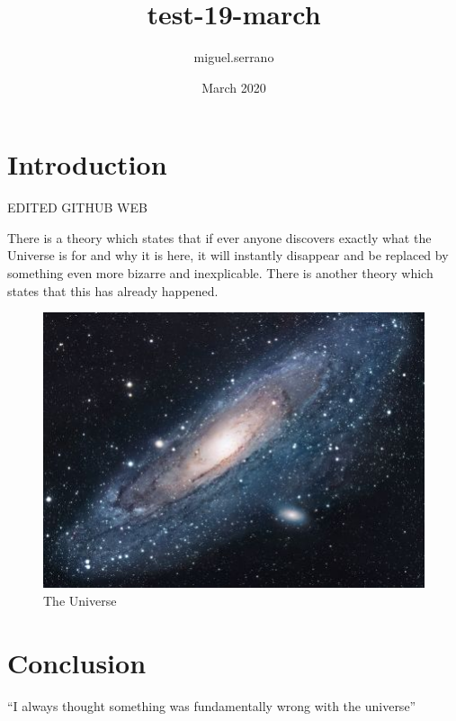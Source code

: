 \documentclass{article}
\title{test-19-march}
\author{miguel.serrano }
\date{March 2020}
\begin{document}
\maketitle

\section{Introduction}

EDITED GITHUB WEB


There is a theory which states that if ever anyone discovers exactly what the Universe is for and why it is here, it will instantly disappear and be replaced by something even more bizarre and inexplicable.
There is another theory which states that this has already happened.

\begin{figure}[h!]
\centering
\includegraphics[scale=1.7]{universe}
\caption{The Universe}
\label{fig:universe}
\end{figure}

\section{Conclusion}
``I always thought something was fundamentally wrong with the universe'' \citep{adams1995hitchhiker}



\end{document}

